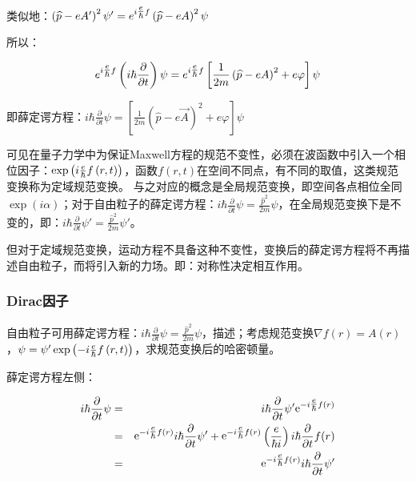 类似地：$\left( {\widehat p - eA'} \right)^2 \psi ' = e^{i{\textstyle{e \over \hbar }}f} \left( {\widehat p - eA} \right)^2 \psi $

所以：

\begin{equation}\label{18-14}
e^{i{\textstyle{e \over \hbar }}f} \left( {i\hbar \frac{\partial }{{\partial t}}} \right)\psi  = e^{i{\textstyle{e \over \hbar }}f} \left[ {\frac{1}{{2m}}\left( {\widehat p - eA} \right)^2  + e\varphi } \right]\psi
\end{equation}

即薛定谔方程：$i\hbar \frac{\partial }{{\partial t}}\psi  = \left[ {\frac{1}{{2m}}\left( {\widehat p - e\vec A} \right)^2  + e\varphi } \right]\psi $

可见在量子力学中为保证Maxwell方程的规范不变性，必须在波函数中引入一个相位因子：$\exp \left( {i{\textstyle{e \over \hbar }}f\left( {r,t} \right)} \right)$，函数$f(r,t)$在空间不同点，有不同的取值，这类规范变换称为定域规范变换。
与之对应的概念是全局规范变换，即空间各点相位全同$\exp \left( {i\alpha } \right)$；对于自由粒子的薛定谔方程：$i\hbar \frac{\partial }{{\partial t}}\psi  = \frac{{\widehat p^2 }}{{2m}}\psi $，在全局规范变换下是不变的，即：$i\hbar \frac{\partial }{{\partial t}}\psi ' = \frac{{\widehat p^2 }}{{2m}}\psi '$。

但对于定域规范变换，运动方程不具备这种不变性，变换后的薛定谔方程将不再描述自由粒子，而将引入新的力场。即：对称性决定相互作用。


\subsubsection{Dirac因子}

自由粒子可用薛定谔方程：$i\hbar \frac{\partial }{{\partial t}}\psi  = \frac{{\widehat p^2 }}{{2m}}\psi $，描述；考虑规范变换$\nabla f(r) = A(r)$，$\psi  = \psi '\exp \left( { - i{\textstyle{e \over \hbar }}f\left( {r,t} \right)} \right)$，求规范变换后的哈密顿量。

薛定谔方程左侧：

\begin{eqnarray*}
i\hbar \frac{\partial }{{\partial t}}\psi & = & i\hbar \frac{\partial }{{\partial t}}\psi '{\mathop{\rm e}\nolimits} ^{ - i{\textstyle{e \over \hbar }}f\left( r \right)} \\
{} & = & {\mathop{\rm e}\nolimits} ^{ - i{\textstyle{e \over \hbar }}f\left( r \right)} i\hbar \frac{\partial }{{\partial t}}\psi ' + {\mathop{\rm e}\nolimits} ^{ - i{\textstyle{e \over \hbar }}f\left( r \right)} \left( {\frac{e}{{\hbar i}}} \right)i\hbar \frac{\partial }{{\partial t}}f(r) \\
{} & = & {\mathop{\rm e}\nolimits} ^{ - i{\textstyle{e \over \hbar }}f\left( r \right)} i\hbar \frac{\partial }{{\partial t}}\psi '
\end{eqnarray*}

